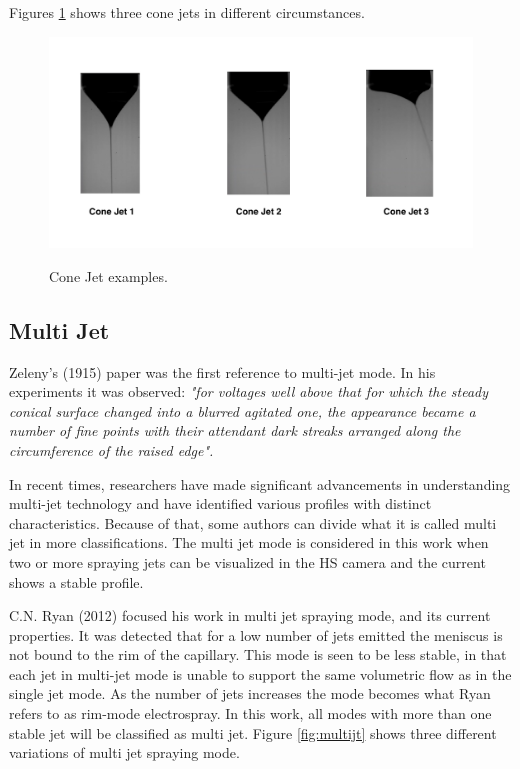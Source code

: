 Figures \ref{fig:conjt} shows three cone jets in different circumstances.

  \begin{figure}[H]
      \center
      \includegraphics[width=15cm]{Figuras/april/conjet.png}
      \label{fig:conjt}
      \caption{Cone Jet examples.}
  \end{figure}


\subsection{Multi Jet}
\label{subsec:Multi Jet}

Zeleny's (1915)\cite{zeleny} paper was the first reference to multi-jet mode. In his experiments it was observed:
\emph{"for voltages well above that for which the steady conical surface changed into a blurred agitated one, the appearance became a number of fine points with their attendant dark streaks arranged along the circumference of the raised edge".}

In recent times, researchers have made significant advancements in understanding multi-jet technology and have identified various profiles with distinct characteristics. Because of that, some authors can divide what it is called multi jet in more classifications.
The multi jet mode is considered in this work when two or more spraying jets can be visualized in the HS camera and the current shows a stable profile. 

C.N. Ryan (2012)\cite{Ryan} focused his work in multi jet spraying mode, and its current properties. 
It was detected that for a low number of jets emitted the meniscus is not bound to the rim of the capillary. 
This mode is seen to be less stable, in that each jet in multi-jet mode is unable to support the same volumetric flow as in the single jet mode.
As the number of jets increases the mode becomes what Ryan refers to as rim-mode electrospray. 
In this work, all modes with more than one stable jet will be classified as multi jet. Figure \ref{fig:multijt} shows three different variations of multi jet spraying mode.



